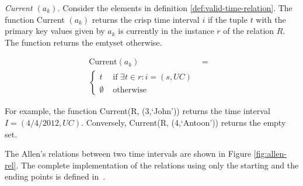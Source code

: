 \begin{definition}
\label{def:current-in-relation}
\emph{Current $\left(a_k \right)$.}
Consider the elements in definition \ref{def:valid-time-relation}. The function Current $\left(a_k \right)$ returns the crisp time interval $i$ if the tuple $t$ with the primary key values given by $a_k$ is currently in the instance $r$ of the relation $R$. The function returns the emtyset otherwise.
% 


\begin{align}
\label{eq:current-in-relation}
\mbox{Current} \left(a_k\right) &=& \\ 
\begin{cases}
\nonumber
t & \mbox{ if } \exists t \in r : i = \left(s, UC \right)\\
\emptyset & \mbox{ otherwise}
\end{cases}
\end{align}
\end{definition}

For example, the function Current(R, (3,`John')) returns the time interval $I = \left(4/4/2012 , UC  \right)$. Conversely, Current(R, (4,`Antoon')) returns the empty set.


The Allen's relations between two time intervals are shown in Figure \ref{fig:allen-rel}. The complete implementation of the relations using only the starting and the ending points is defined in~\cite{Nagypal2003}.

